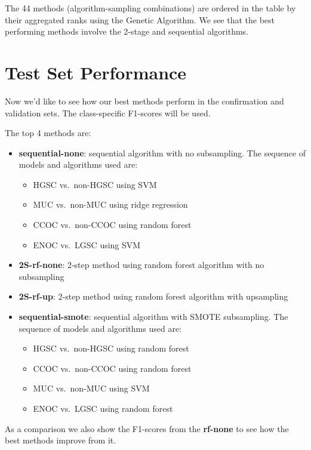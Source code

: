 \documentclass[
]{report}
\providecommand{\tightlist}{%
  \setlength{\itemsep}{0pt}\setlength{\parskip}{0pt}}
\begin{document}
The 44 methods (algorithm-sampling combinations) are ordered in the table by their aggregated ranks using the Genetic Algorithm. We see that the best performing methods involve the 2-stage and sequential algorithms.

\hypertarget{test-set-performance}{%
\section{Test Set Performance}\label{test-set-performance}}

Now we'd like to see how our best methods perform in the confirmation and validation sets. The class-specific F1-scores will be used.

The top 4 methods are:

\begin{itemize}
\tightlist
\item
  \textbf{sequential-none}: sequential algorithm with no subsampling. The sequence of models and algorithms used are:

  \begin{itemize}
  \tightlist
  \item
    HGSC vs.~non-HGSC using SVM
  \item
    MUC vs.~non-MUC using ridge regression
  \item
    CCOC vs.~non-CCOC using random forest
  \item
    ENOC vs.~LGSC using SVM
  \end{itemize}
\item
  \textbf{2S-rf-none}: 2-step method using random forest algorithm with no subsampling
\item
  \textbf{2S-rf-up}: 2-step method using random forest algorithm with upsampling
\item
  \textbf{sequential-smote}: sequential algorithm with SMOTE subsampling. The sequence of models and algorithms used are:

  \begin{itemize}
  \tightlist
  \item
    HGSC vs.~non-HGSC using random forest
  \item
    CCOC vs.~non-CCOC using random forest
  \item
    MUC vs.~non-MUC using SVM
  \item
    ENOC vs.~LGSC using random forest
  \end{itemize}
\end{itemize}

As a comparison we also show the F1-scores from the \textbf{rf-none} to see how the best methods improve from it.
\end{document}

